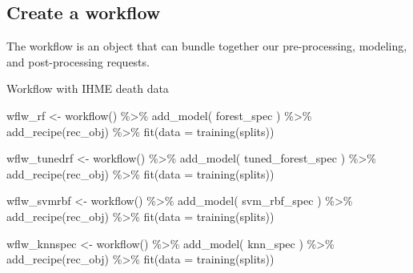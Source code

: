 \documentclass[
]{article}
\newenvironment{Shaded}{\begin{snugshade}}{\end{snugshade}}
\newcommand{\AttributeTok}[1]{\textcolor[rgb]{0.77,0.63,0.00}{#1}}
\newcommand{\FunctionTok}[1]{\textcolor[rgb]{0.00,0.00,0.00}{#1}}
\newcommand{\NormalTok}[1]{#1}
\newcommand{\OtherTok}[1]{\textcolor[rgb]{0.56,0.35,0.01}{#1}}
\newcommand{\SpecialCharTok}[1]{\textcolor[rgb]{0.00,0.00,0.00}{#1}}
\begin{document}
\hypertarget{create-a-workflow}{%
\subsection{Create a workflow}\label{create-a-workflow}}

The workflow is an object that can bundle together our pre-processing,
modeling, and post-processing requests.

Workflow with IHME death data

\begin{Shaded}
\begin{Highlighting}[]
\NormalTok{wflw\_rf }\OtherTok{\textless{}{-}} \FunctionTok{workflow}\NormalTok{() }\SpecialCharTok{\%\textgreater{}\%}
    \FunctionTok{add\_model}\NormalTok{(}
\NormalTok{        forest\_spec}
\NormalTok{    ) }\SpecialCharTok{\%\textgreater{}\%}
    \FunctionTok{add\_recipe}\NormalTok{(rec\_obj) }\SpecialCharTok{\%\textgreater{}\%}
    \FunctionTok{fit}\NormalTok{(}\AttributeTok{data =} \FunctionTok{training}\NormalTok{(splits))}

\NormalTok{wflw\_tunedrf }\OtherTok{\textless{}{-}} \FunctionTok{workflow}\NormalTok{() }\SpecialCharTok{\%\textgreater{}\%}
    \FunctionTok{add\_model}\NormalTok{(}
\NormalTok{        tuned\_forest\_spec}
\NormalTok{    ) }\SpecialCharTok{\%\textgreater{}\%}
    \FunctionTok{add\_recipe}\NormalTok{(rec\_obj) }\SpecialCharTok{\%\textgreater{}\%}
    \FunctionTok{fit}\NormalTok{(}\AttributeTok{data =} \FunctionTok{training}\NormalTok{(splits))}

\NormalTok{wflw\_svmrbf }\OtherTok{\textless{}{-}} \FunctionTok{workflow}\NormalTok{() }\SpecialCharTok{\%\textgreater{}\%}
    \FunctionTok{add\_model}\NormalTok{(}
\NormalTok{        svm\_rbf\_spec}
\NormalTok{    ) }\SpecialCharTok{\%\textgreater{}\%}
    \FunctionTok{add\_recipe}\NormalTok{(rec\_obj) }\SpecialCharTok{\%\textgreater{}\%}
    \FunctionTok{fit}\NormalTok{(}\AttributeTok{data =} \FunctionTok{training}\NormalTok{(splits))}

\NormalTok{wflw\_knnspec }\OtherTok{\textless{}{-}} \FunctionTok{workflow}\NormalTok{() }\SpecialCharTok{\%\textgreater{}\%}
    \FunctionTok{add\_model}\NormalTok{(}
\NormalTok{        knn\_spec}
\NormalTok{    ) }\SpecialCharTok{\%\textgreater{}\%}
    \FunctionTok{add\_recipe}\NormalTok{(rec\_obj) }\SpecialCharTok{\%\textgreater{}\%}
    \FunctionTok{fit}\NormalTok{(}\AttributeTok{data =} \FunctionTok{training}\NormalTok{(splits))  }


\end{Highlighting}
\end{Shaded}
\end{document}
